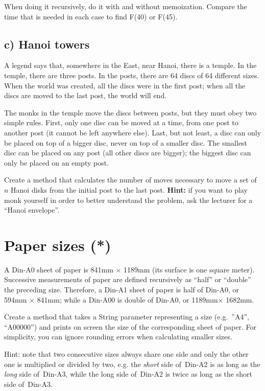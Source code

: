 \documentclass{article}
\begin{document}
When doing it recursively, do it with and without memoization. Compare
the time that is needed in each case to find F(40) or F(45). 

\subsection{c) Hanoi towers}

A legend says that, somewhere in the East, near Hanoi, there is a
temple. In the temple, there are three posts. In the posts, there are
64 discs of 64 different sizes. When the world was created, all the
discs were in the first post; when all the discs are moved to the
last post, the world will end. 

The monks in the temple move the discs between posts, but they must
obey two simple rules. First, only one disc can be moved at a time,
from one post to another post (it cannot be left anywhere else). Last,
but not least, a disc can only be placed on top of a bigger disc, never
on top of a smaller disc. The smallest disc can be placed
on any post (all other discs are bigger); the biggest disc can only be
placed on an empty post.

Create a method that calculates the number of moves necessary to move
a set of $n$ Hanoi disks from the initial post to the last post. 
\textbf{Hint:}
if you want to play monk yourself in order to better understand the
problem, ask the lecturer for a ``Hanoi envelope''. 

\section{Paper sizes (*)}
\label{sec:paper-sizes}

A Din-A0 sheet of paper is 841mm $\times$ 1189mm (its surface is one
square meter). Successive measurements of paper are defined
recursively as ``half'' or ``double'' the preceding size. Therefore,
a Din-A1 sheet of paper is half of Din-A0, or 594mm $\times$ 841mm;
while a Din-A00 is double of Din-A0, or 1189mm$\times$ 1682mm. 

Create a method that takes a String parameter representing a size
(e.g.~''A4'', ``A00000'') and prints on screen the size of the
corresponding sheet of paper. For simplicity, you can ignore rounding
errors when calculating smaller sizes. 

Hint: note that two consecutive sizes always share one side and only
the other one is multiplied or divided by two, e.g. the \emph{short}
side of~Din-A2 is as long as the \emph{long} side of~Din-A3, while the
long side of~Din-A2 is twice as long as the short side of~Din-A3.
\end{document}
